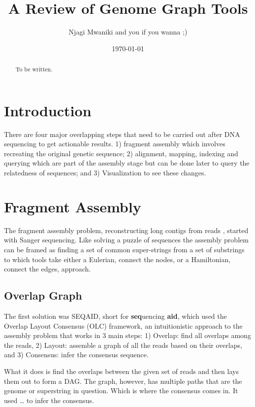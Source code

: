 \documentclass[11pt]{article}
\author{Njagi Mwaniki and you if you wanna ;)}
\date{\today}
\title{A Review of Genome Graph Tools}
\begin{document}
\maketitle
\newcommand{\bigO}{\mathcal{O}}

\begin{abstract}
To be written.
\end{abstract}
\newpage
\tableofcontents
\listoffigures
\newpage
\section{Introduction}
\label{sec:orgfc4429c}

There are four major overlapping steps that need to be carried out after DNA 
sequencing to get actionable results. 1) fragment assembly which involves 
recreating the original genetic sequence; 2) alignment, mapping, indexing and 
querying which are part of the assembly stage but can be done later to query the
relatedness of sequences; and 3) Visualization to see these changes.\cite{flicekSenseSequenceReads2009}

\section{Fragment Assembly}
\label{sec:org838275c}
The fragment assembly problem, reconstructing long contigs from reads
\cite{chikhiCompactingBruijnGraphs2016}, started with Sanger sequencing.
Like solving a puzzle of sequences the assembly problem can be framed as finding
a set of common super-strings from a set of substrings to which tools take 
either a Eulerian, connect the nodes, or a Hamiltonian, connect the edges, 
approach.

\subsection{Overlap Graph}
\label{sec:orgb4f1fd4}
The first solution was SEQAID, short for \textbf{seq}uencing \textbf{aid},
\cite{peltolaSEQAIDDNASequence1984} which used the  Overlap Layout Consensus (OLC)
framework, an intuitionistic approach to the assembly problem that works in  
3 main steps: 1) Overlap: find all overlaps among the reads, 2) Layout: assemble
a graph of all the reads based on their overlaps, and 3) Consensus: infer the
consensus sequence.

What it does is find the overlaps between the given set of reads and then lays 
them out to form a DAG. The graph, however, has multiple paths that are the 
genome or superstring in question. Which is where the consensus comes in. 
It used … to infer the consensus.
\end{document}
